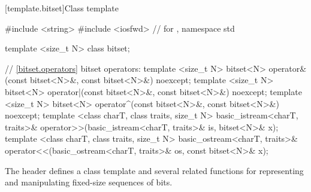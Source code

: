 [template.bitset]{Class template }%

%

\begin{codeblock}
#include <string>
#include <iosfwd>               // for , 
namespace std {
  template <size_t N> class bitset;

  // \ref{bitset.operators} bitset operators:
  template <size_t N>
    bitset<N> operator&(const bitset<N>&, const bitset<N>&) noexcept;
  template <size_t N>
    bitset<N> operator|(const bitset<N>&, const bitset<N>&) noexcept;
  template <size_t N>
    bitset<N> operator^(const bitset<N>&, const bitset<N>&) noexcept;
  template <class charT, class traits, size_t N>
    basic_istream<charT, traits>&
    operator>>(basic_istream<charT, traits>& is, bitset<N>& x);
  template <class charT, class traits, size_t N>
    basic_ostream<charT, traits>&
    operator<<(basic_ostream<charT, traits>& os, const bitset<N>& x);
}
\end{codeblock}

\pnum
The header
defines a
class template
and several related functions for representing
and manipulating fixed-size sequences of bits.

